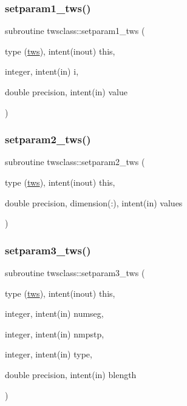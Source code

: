 \subsubsection{\texorpdfstring{setparam1\_tws()}{setparam1\_tws()}}
{\footnotesize\ttfamily subroutine twsclass\+::setparam1\+\_\+tws (\begin{DoxyParamCaption}\item[{type (\mbox{\hyperlink{namespacetwsclass_structtwsclass_1_1tws}{tws}}), intent(inout)}]{this,  }\item[{integer, intent(in)}]{i,  }\item[{double precision, intent(in)}]{value }\end{DoxyParamCaption})}

\mbox{\label{namespacetwsclass_a24b51ee452bd448a84120562cb38c085}} 
\subsubsection{\texorpdfstring{setparam2\_tws()}{setparam2\_tws()}}
{\footnotesize\ttfamily subroutine twsclass\+::setparam2\+\_\+tws (\begin{DoxyParamCaption}\item[{type (\mbox{\hyperlink{namespacetwsclass_structtwsclass_1_1tws}{tws}}), intent(inout)}]{this,  }\item[{double precision, dimension(\+:), intent(in)}]{values }\end{DoxyParamCaption})}

\mbox{\label{namespacetwsclass_acdc918f464e4b8dbf86ea0e00b0d7335}} 
\subsubsection{\texorpdfstring{setparam3\_tws()}{setparam3\_tws()}}
{\footnotesize\ttfamily subroutine twsclass\+::setparam3\+\_\+tws (\begin{DoxyParamCaption}\item[{type (\mbox{\hyperlink{namespacetwsclass_structtwsclass_1_1tws}{tws}}), intent(inout)}]{this,  }\item[{integer, intent(in)}]{numseg,  }\item[{integer, intent(in)}]{nmpstp,  }\item[{integer, intent(in)}]{type,  }\item[{double precision, intent(in)}]{blength }\end{DoxyParamCaption})}



